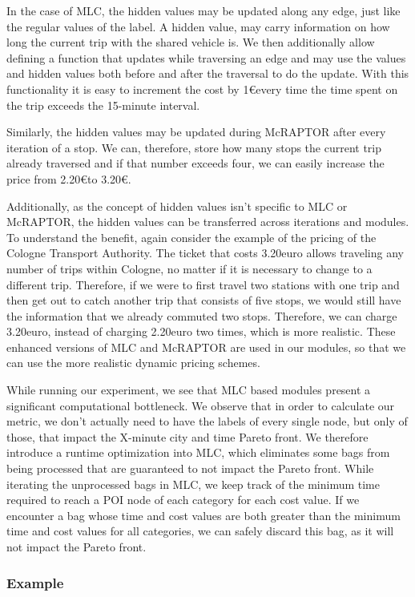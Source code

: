 In the case of MLC, the hidden values may be updated along any edge, just like the regular values of the label.
A hidden value, may carry information on how long the current trip with the shared vehicle is.
We then additionally allow defining a function that updates while traversing an edge and may use the values and hidden values both before and after the traversal to do the update.
With this functionality it is easy to increment the cost by 1\euro every time the time spent on the trip exceeds the 15-minute interval.

Similarly, the hidden values may be updated during McRAPTOR after every iteration of a stop.
We can, therefore, store how many stops the current trip already traversed and if that number exceeds four, we can easily increase the price from 2.20\euro to 3.20\euro.

Additionally, as the concept of hidden values isn't specific to MLC or McRAPTOR, the hidden values can be transferred across iterations and modules.
To understand the benefit, again consider the example of the pricing of the Cologne Transport Authority.
The ticket that costs 3.20euro allows traveling any number of trips within Cologne, no matter if it is necessary to change to a different trip.
Therefore, if we were to first travel two stations with one trip and then get out to catch another trip that consists of five stops, we would still have the information that we already commuted two stops.
Therefore, we can charge 3.20euro, instead of charging 2.20euro two times, which is more realistic.
These enhanced versions of MLC and McRAPTOR are used in our modules, so that we can use the more realistic dynamic pricing schemes.

While running our experiment, we see that MLC based modules present a significant computational bottleneck.
We observe that in order to calculate our metric, we don't actually need to have the labels of every single node, but only of those, that impact the X-minute city and time Pareto front.
We therefore introduce a runtime optimization into MLC, which eliminates some bags from being processed that are guaranteed to not impact the Pareto front.
While iterating the unprocessed bags in MLC, we keep track of the minimum time required to reach a POI node of each category for each cost value.
If we encounter a bag whose time and cost values are both greater than the minimum time and cost values for all categories, we can safely discard this bag, as it will not impact the Pareto front.


\subsubsection{Example}
\label{subsubsec:example}

